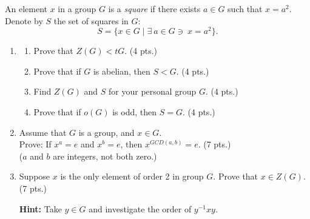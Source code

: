 \begin{definition}
An element $ x $ in a group $ G $ is a \textit{square} if there exists $ a \in G $ such that $ x = a^2 $. Denote by $ S $ the set of squares in $ G $:
\[
S = \{ x \in G \mid \exists \ a \in G \ni \  x = a^2 \}.
\]
\end{definition}
\vspace{0.1in}
\begin{enumerate}
    \setlength{\itemsep}{15pt} %
    \item
    \begin{enumerate}
        \setlength{\itemsep}{10pt} %
        \item[(a)] Prove that $ Z(G) < t G $. \hfill (4 pts.)
        \item[(b)] Prove that if $ G $ is abelian, then $ S < G $. \hfill (4 pts.)
        \item[(c)] Find $ Z(G) $ and $ S $ for your personal group $ G $. \hfill (4 pts.)
        \item[(d)] Prove that if $ o(G) $ is odd, then $ S = G $. \hfill (4 pts.)
    \end{enumerate} 
    
    \item Assume that $ G $ is a group, and $ x \in G $. \\
    \noindent Prove: If $ x^a = e $ and $ x^b = e $, then $ x^{GCD(a,b)} = e $. \hfill (7 pts.) \\
    ($ a $ and $ b $ are integers, not both zero.)
    
    \item Suppose $ x $ is the only element of order 2 in group $ G $. Prove that $ x \in Z(G) $. \hfill (7 pts.)

    \textbf{Hint:} Take $ y \in G $ and investigate the order of $ y^{-1}xy $.
\end{enumerate}

